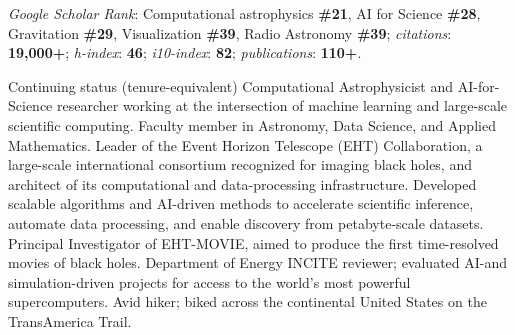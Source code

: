 
\vspace{-3pt}

\noindent
\emph{Google Scholar Rank}:
%
Computational astrophysics \textbf{\#21},
AI for Science             \textbf{\#28},
Gravitation                \textbf{\#29},
Visualization              \textbf{\#39},
Radio Astronomy            \textbf{\#39};
%
\emph{citations}:    \textbf{19,000+};
\emph{h-index}:      \textbf{46};
\emph{i10-index}:    \textbf{82};
\emph{publications}: \textbf{110+}.

\vspace{6pt}

Continuing status (tenure-equivalent) Computational Astrophysicist and
AI-for-Science researcher working at the intersection of machine
learning and large-scale scientific computing.
Faculty member in Astronomy, Data Science, and Applied Mathematics.
Leader of the Event Horizon Telescope (EHT) Collaboration, a
large-scale international consortium recognized for imaging black
holes, and architect of its computational and data-processing
infrastructure.
Developed scalable algorithms and AI-driven methods to accelerate
scientific inference, automate data processing, and enable discovery
from petabyte-scale datasets.
Principal Investigator of EHT-MOVIE, aimed to produce the first
time-resolved movies of black holes.
Department of Energy INCITE reviewer; evaluated AI-and
simulation-driven projects for access to the world’s most powerful
supercomputers.
Avid hiker; biked across the continental United States on the
TransAmerica Trail.
